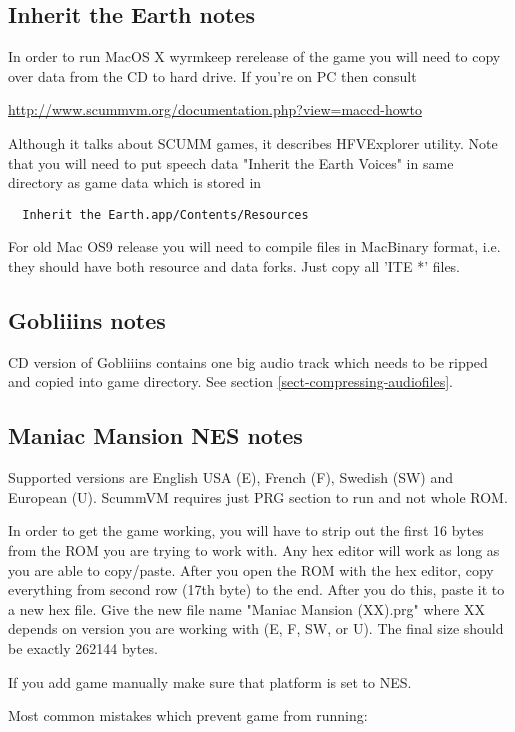 \subsection{Inherit the Earth notes}
In order to run MacOS X wyrmkeep rerelease of the game you will need to copy
over data from the CD to hard drive. If you're on PC then consult

\url{http://www.scummvm.org/documentation.php?view=maccd-howto}

Although it talks about SCUMM games, it describes HFVExplorer utility. Note
that you will need to put speech data "Inherit the Earth Voices" in same
directory as game data which is stored in

\begin{verbatim}
  Inherit the Earth.app/Contents/Resources
\end{verbatim}

For old Mac OS9 release you will need to compile files in MacBinary format,
i.e. they should have both resource and data forks. Just copy all 'ITE *' files.


\subsection{Gobliiins notes}
CD version of Gobliiins contains one big audio track which needs to be ripped
and copied into game directory. See section \ref{sect-compressing-audiofiles}.


\subsection{Maniac Mansion NES notes}
Supported versions are English USA (E), French (F), Swedish (SW) and 
European (U). ScummVM requires just PRG section to run and not whole ROM.

In order to get the game working, you will have to strip out the first
16 bytes from the ROM you are trying to work with. Any hex editor will work 
as long as you are able to copy/paste.  After you open the ROM with the 
hex editor, copy everything from second row (17th byte) to the end. After
you do this, paste it to a new hex file. Give the new file name 
"Maniac Mansion (XX).prg" where XX depends on version you are  working 
with (E, F, SW, or U).  The final size should be exactly 262144 bytes.

If you add game manually make sure that platform is set to NES.

Most common mistakes which prevent game from running:

